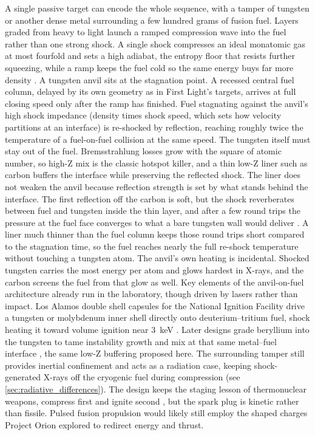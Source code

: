 \documentclass{article}
\begin{document}
A single passive target can encode the whole sequence, with a tamper of tungsten or another dense metal surrounding a few hundred grams of fusion fuel. Layers graded from heavy to light launch a ramped compression wave into the fuel rather than one strong shock. A single shock compresses an ideal monatomic gas at most fourfold and sets a high adiabat, the entropy floor that resists further squeezing, while a ramp keeps the fuel cold so the same energy buys far more density \cite{zeldovich_raizer}. A tungsten anvil sits at the stagnation point. A recessed central fuel column, delayed by its own geometry as in First Light's targets, arrives at full closing speed only after the ramp has finished. Fuel stagnating against the anvil's high shock impedance (density times shock speed, which sets how velocity partitions at an interface) is re-shocked by reflection, reaching roughly twice the temperature of a fuel-on-fuel collision at the same speed. The tungsten itself must stay out of the fuel. Bremsstrahlung losses grow with the square of atomic number, so high-Z mix is the classic hotspot killer, and a thin low-Z liner such as carbon buffers the interface while preserving the reflected shock. The liner does not weaken the anvil because reflection strength is set by what stands behind the interface. The first reflection off the carbon is soft, but the shock reverberates between fuel and tungsten inside the thin layer, and after a few round trips the pressure at the fuel face converges to what a bare tungsten wall would deliver \cite{zeldovich_raizer}. A liner much thinner than the fuel column keeps those round trips short compared to the stagnation time, so the fuel reaches nearly the full re-shock temperature without touching a tungsten atom. The anvil's own heating is incidental. Shocked tungsten carries the most energy per atom and glows hardest in X-rays, and the carbon screens the fuel from that glow as well. Key elements of the anvil-on-fuel architecture already run in the laboratory, though driven by lasers rather than impact. Los Alamos double shell capsules for the National Ignition Facility drive a tungsten or molybdenum inner shell directly onto deuterium--tritium fuel, shock heating it toward volume ignition near \SI{3}{\kilo\electronvolt} \cite{montgomery2018doubleshell}. Later designs grade beryllium into the tungsten to tame instability growth and mix at that same metal--fuel interface \cite{stark2024gradedshells}, the same low-Z buffering proposed here. The surrounding tamper still provides inertial confinement and acts as a radiation case, keeping shock-generated X-rays off the cryogenic fuel during compression (see \autoref{sec:radiative_differences}). The design keeps the staging lesson of thermonuclear weapons, compress first and ignite second \cite{doe_hbomb_history}, but the spark plug is kinetic rather than fissile. Pulsed fusion propulsion would likely still employ the shaped charges Project Orion explored to redirect energy and thrust.
\end{document}
